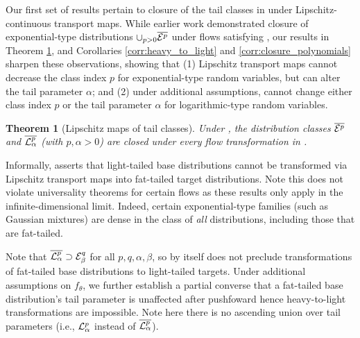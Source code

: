 \documentclass{article}
\newtheorem{theorem}{Theorem}
\theoremstyle{definition}
\theoremstyle{remark}
\begin{document}
\vspace{-1mm}
Our first set of results pertain to closure of the tail classes in 
under Lipschitz-continuous transport maps. While earlier work \citep{jaini2020tails} demonstrated
closure of exponential-type distributions $\cup_{p > 0} \overline{\mathcal{E}^p}$ under flows satisfying , our results in Theorem \ref{thm:distn_class_closed}, and Corollaries \ref{corr:heavy_to_light} and \ref{corr:closure_polynomials} sharpen these observations, showing that (1) Lipschitz transport maps cannot decrease the class index $p$ for exponential-type random variables, but can alter the tail parameter $\alpha$; and
(2) under additional assumptions, cannot change either class index $p$ or the tail parameter $\alpha$ for logarithmic-type random variables.

\begin{theorem}[Lipschitz maps of tail classes]
  \label{thm:distn_class_closed}
  Under ,
  the distribution classes $\overline{\mathcal{E}^p}$
  and $\overline{\mathcal{L}^p_\alpha}$ (with $p,\alpha > 0$) are closed
  under every flow transformation in .
\end{theorem}

Informally,  asserts that light-tailed base distributions cannot be transformed
via Lipschitz transport maps into fat-tailed target distributions.
Note this does not violate universality theorems for certain flows \cite{huang2018neural}
as these results only apply in the infinite-dimensional limit. Indeed, certain exponential-type families (such as Gaussian mixtures) are dense in the class of \emph{all} distributions, including those that are fat-tailed.

Note that $\overline{\mathcal{L}^p_\alpha} \supset \mathcal{E}^q_\beta$ for all $p,q,\alpha,\beta$, so 
by itself does not preclude transformations of fat-tailed base distributions to light-tailed targets.
Under additional assumptions on $f_\theta$, we further establish a partial converse that a fat-tailed base distribution's tail parameter is unaffected after pushfoward
hence heavy-to-light transformations are impossible. Note here there is no ascending union over
tail parameters (i.e., $\mathcal{L}^p_\alpha$ instead of $\overline{\mathcal{L}^p_\alpha}$).
\end{document}
